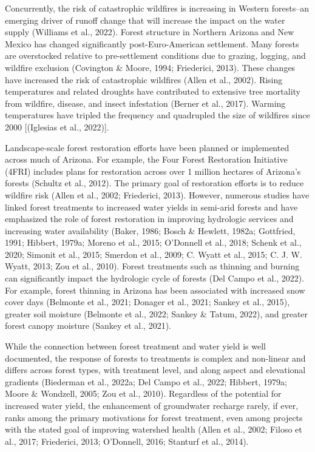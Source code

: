 \documentclass[
]{agujournal2019}
\begin{document}
Concurrently, the risk of catastrophic wildfires is increasing in
Western forests--an emerging driver of runoff change that will increase
the impact on the water supply (Williams et al., 2022). Forest structure
in Northern Arizona and New Mexico has changed significantly
post-Euro-American settlement. Many forests are overstocked relative to
pre-settlement conditions due to grazing, logging, and wildfire
exclusion (Covington \& Moore, 1994; Friederici, 2013). These changes
have increased the risk of catastrophic wildfires (Allen et al., 2002).
Rising temperatures and related droughts have contributed to extensive
tree mortality from wildfire, disease, and insect infestation (Berner et
al., 2017). Warming temperatures have tripled the frequency and
quadrupled the size of wildfires since 2000 {[}(Iglesias et al.,
2022){]}.

Landscape-scale forest restoration efforts have been planned or
implemented across much of Arizona. For example, the Four Forest
Restoration Initiative (4FRI) includes plans for restoration across over
1 million hectares of Arizona's forests (Schultz et al., 2012). The
primary goal of restoration efforts is to reduce wildfire risk (Allen et
al., 2002; Friederici, 2013). However, numerous studies have linked
forest treatments to increased water yields in semi-arid forests and
have emphasized the role of forest restoration in improving hydrologic
services and increasing water availability (Baker, 1986; Bosch \&
Hewlett, 1982a; Gottfried, 1991; Hibbert, 1979a; Moreno et al., 2015;
O'Donnell et al., 2018; Schenk et al., 2020; Simonit et al., 2015;
Smerdon et al., 2009; C. Wyatt et al., 2015; C. J. W. Wyatt, 2013; Zou
et al., 2010). Forest treatments such as thinning and burning can
significantly impact the hydrologic cycle of forests (Del Campo et al.,
2022). For example, forest thinning in Arizona has been associated with
increased snow cover days (Belmonte et al., 2021; Donager et al., 2021;
Sankey et al., 2015), greater soil moisture (Belmonte et al., 2022;
Sankey \& Tatum, 2022), and greater forest canopy moisture (Sankey et
al., 2021).

While the connection between forest treatment and water yield is well
documented, the response of forests to treatments is complex and
non-linear and differs across forest types, with treatment level, and
along aspect and elevational gradients (Biederman et al., 2022a; Del
Campo et al., 2022; Hibbert, 1979a; Moore \& Wondzell, 2005; Zou et al.,
2010). Regardless of the potential for increased water yield, the
enhancement of groundwater recharge rarely, if ever, ranks among the
primary motivations for forest treatment, even among projects with the
stated goal of improving watershed health (Allen et al., 2002; Filoso et
al., 2017; Friederici, 2013; O'Donnell, 2016; Stanturf et al., 2014).
\end{document}
